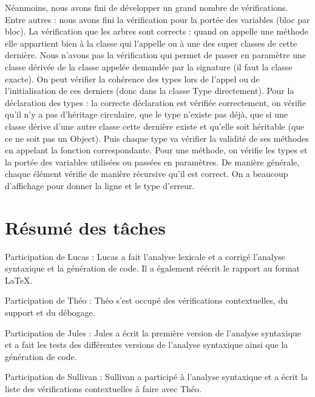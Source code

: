 \documentclass[12pt,a4paper]{article}
\begin{document}
Néanmoins, nous avons fini de développer un grand nombre de vérifications. Entre autres : nous avons fini la vérification pour la portée des variables (bloc par bloc). La vérification que les arbres sont corrects : quand on appelle une méthode elle appartient bien à la classe qui l’appelle ou à une des super classes de cette dernière. Nous n’avons pas la vérification qui permet de passer en paramètre une classe dérivée de la classe appelée demandée par la signature (il faut la classe exacte). On peut vérifier la cohérence des types lors de l’appel ou de l’initialisation de ces derniers (donc dans la classe Type directement). Pour la déclaration des types : la correcte déclaration est vérifiée correctement, on vérifie qu’il n’y a pas d’héritage circulaire, que le type n'existe pas déjà, que si une classe dérive d'une autre classe cette dernière existe et qu’elle soit héritable (que ce ne soit pas un Object). Puis chaque type va vérifier la validité de ses méthodes en appelant la fonction correspondante. Pour une méthode, on vérifie les types et la portée des variables utilisées ou passées en paramètres. De manière générale, chaque élément vérifie de manière récursive qu’il est correct. On a beaucoup d’affichage pour donner la ligne et le type d’erreur.

\section{Résumé des tâches}

Participation de Lucas : Lucas a fait l’analyse lexicale et a corrigé l’analyse syntaxique et la génération de code. Il a également réécrit le rapport au format \LaTeX .

Participation de Théo : Théo s’est occupé des vérifications contextuelles, du support et du débogage.

Participation de Jules : Jules a écrit la première version de l’analyse syntaxique et a fait les tests des différentes versions de l’analyse syntaxique ainsi que la génération de code.

Participation de Sullivan : Sullivan a participé à l’analyse syntaxique et a écrit la liste des vérifications contextuelles à faire avec Théo.
\end{document}
